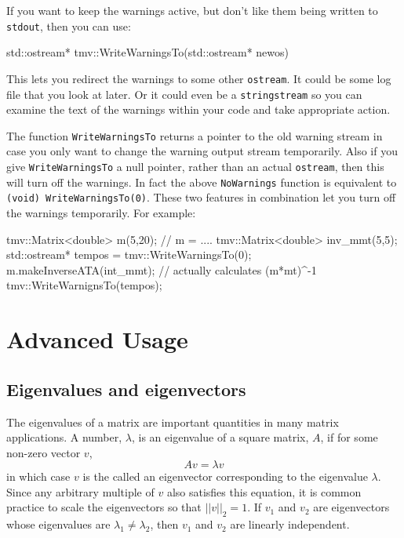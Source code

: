 \documentclass[twoside,letterpaper,11pt]{article}
\renewcommand{\tt}[1]{{\lstinline {#1}}}
\begin{document}
If you want to keep the warnings active, but don't like them being written to \tt{stdout}, then 
you can use:
\begin{tmvcode}
std::ostream* tmv::WriteWarningsTo(std::ostream* newos)
\end{tmvcode}
This lets you redirect the warnings to some other \tt{ostream}.  It could be some log file
that you look at later.  Or it could even be a \tt{stringstream} so you can examine the text
of the warnings within your code and take appropriate action.

The function \tt{WriteWarningsTo} returns a pointer to the old warning stream
in case you only want to change the warning output stream temporarily.
Also if you give \tt{WriteWarningsTo} a null pointer, rather than an actual \tt{ostream},
then this will turn off the warnings.  In fact the above \tt{NoWarnings} function is 
equivalent to \tt{(void) WriteWarningsTo(0)}.  These two features in combination
let you turn off the warnings temporarily.  For example:
\begin{tmvcode}
tmv::Matrix<double> m(5,20);
// m = ....
tmv::Matrix<double> inv_mmt(5,5);
std::ostream* tempos = tmv::WriteWarningsTo(0);
m.makeInverseATA(int_mmt); // actually calculates (m*mt)^-1
tmv::WriteWarnignsTo(tempos);
\end{tmvcode}

\newpage
\section{Advanced Usage}

\subsection{Eigenvalues and eigenvectors}

The eigenvalues of a matrix are important quantities in many matrix applications.
A number, $\lambda$, is an eigenvalue of a square matrix, $A$, if for some
non-zero vector $v$,
\begin{equation*}
A v = \lambda v
\end{equation*}
in which case $v$ is the called an eigenvector corresponding to the eigenvalue $\lambda$.
Since any arbitrary multiple of $v$ also satisfies this equation, it is common practice
to scale the eigenvectors so that $||v||_2 = 1$.
If $v_1$ and $v_2$ are eigenvectors whose eigenvalues are 
$\lambda_1 \neq \lambda_2$, then $v_1$ and $v_2$ are linearly independent.
\end{document}
